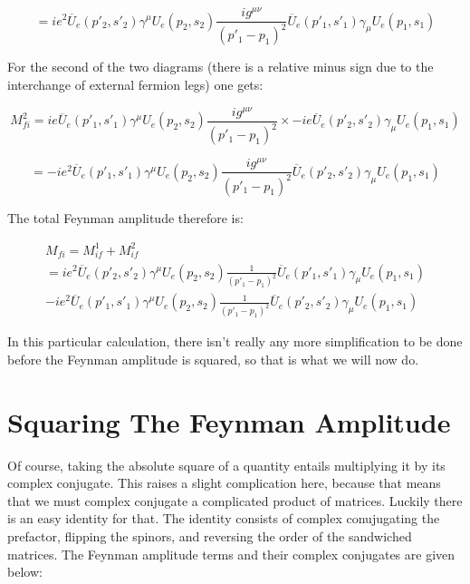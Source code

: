 \documentclass[a4]{article}
\begin{document}
    \begin{equation}
    = i e^2 \overline{U}_e (p'_2, s'_2) \gamma^{\mu} U_e (p_2, s_2) \frac{i g^{\mu \nu}}{(p'_1 - p_1)^2} \overline{U}_e (p'_1, s'_1) \gamma_{\mu} U_e (p_1, s_1)
    \end{equation}

    For the second of the two diagrams (there is a relative minus sign due to the interchange of external fermion legs) one gets:

    \begin{equation}
        M_{fi}^2 = i e \overline{U}_e (p'_1, s'_1) \gamma^{\mu} U_e (p_2, s_2) \frac{i g^{\mu \nu}}{(p'_1 - p_1)^2} \times - i e \overline{U}_e (p'_2, s'_2) \gamma_{\mu} U_e (p_1, s_1)
    \end{equation}

    \begin{equation}
    = - i e^2 \overline{U}_e (p'_1, s'_1) \gamma^{\mu} U_e (p_2, s_2) \frac{i g^{\mu \nu}}{(p'_1 - p_1)^2} \overline{U}_e (p'_2, s'_2) \gamma_{\mu} U_e (p_1, s_1)
    \end{equation}

    The total Feynman amplitude therefore is:

    \begin{eqnarray}
        M_{fi} = M_{if}^1 + M_{if}^2 \\
        = i e^2 \overline{U}_e (p'_2, s'_2) \gamma^{\mu} U_e (p_2, s_2) \frac{1}{(p'_1 - p_1)^2} \overline{U}_e (p'_1, s'_1) \gamma_{\mu} U_e (p_1, s_1) \\
        - i e^2 \overline{U}_e (p'_1, s'_1) \gamma^{\mu} U_e (p_2, s_2) \frac{1}{(p'_1 - p_1)^2} \overline{U}_e (p'_2, s'_2) \gamma_{\mu} U_e (p_1, s_1)
    \end{eqnarray}

    In this particular calculation, there isn't really any more simplification to be done before the Feynman amplitude is squared, so that is what we will now do.

    \section*{Squaring The Feynman Amplitude}

    Of course, taking the absolute square of a quantity entails multiplying it by its complex conjugate. This raises a slight complication here, because that means that we must complex conjugate a complicated product of matrices. Luckily there is an easy identity for that. The identity
    consists of complex conujugating the prefactor, flipping the spinors, and reversing the order of the sandwiched matrices. The Feynman amplitude terms and their complex conjugates are given below:
\end{document}
